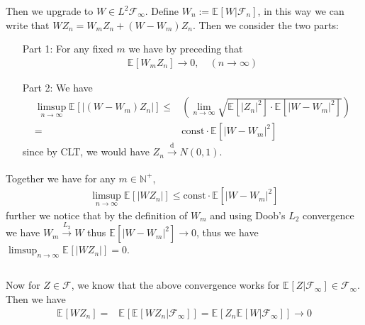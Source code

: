 \documentclass[11pt,a4paper]{ctexart}
\numberwithin{equation}{section}%
\newcommand{\F}{\mathcal{F}}
\begin{document}
Then we upgrade to $ W\in L^2\F_\infty $. Define $ W_n:= \mathbb{E}_{  }\left[ W| \F_{n} \right] $, in this way we can write that $ WZ_n = W_mZ_n + (W-W_m)Z_n $. Then we consider the two parts:
\begin{itemize}[topsep=2pt,itemsep=0pt]
    \item[Part 1:] For any fixed $ m $ we have by preceding that
    \begin{align*}
        \mathbb{E}_{  }\left[ W_mZ_n \right] \to 0,\quad (n\to\infty) 
    \end{align*}
    \item[Part 2:] We have
    \begin{align*}
        \limsup_{n\to\infty} \mathbb{E}_{  }\left[ \left\vert (W-W_m)Z_n \right\vert  \right]  \leq & (\lim_{n\to\infty}\sqrt{\mathbb{E}_{  }\left[ \left\vert Z_n \right\vert^2  \right] \cdot \mathbb{E}_{  }\left[ \left\vert W-W_m \right\vert^2  \right] }) \\
        =& \mathrm{const}\cdot \mathbb{E}_{  }\left[ \left\vert W-W_m \right\vert ^2 \right] 
    \end{align*}
    since by CLT, we would have $ Z_n\xrightarrow[]{\mathrm{d}} N(0,1) $.
\end{itemize}
Together we have for any $ m\in \mathbb{N}^+ $, 
\begin{align*}
    \limsup_{n\to\infty} \mathbb{E}_{  }\left[ \left\vert WZ_n \right\vert  \right] \leq \mathrm{const}\cdot \mathbb{E}_{  }\left[ \left\vert W-W_m \right\vert ^2 \right]
\end{align*}
further we notice that by the definition of $ W_m $ and using Doob's $ L_2 $ convergence we have $ W_m\xrightarrow[]{L_2} W $ thus $ \mathbb{E}_{  }\left[ \left\vert W-W_m \right\vert ^2  \right] \to 0 $, thus we have $ \limsup_{n\to\infty} \mathbb{E}_{  }\left[ \left\vert WZ_n \right\vert  \right] =0 $.






\subsection{}


Now for $ Z\in \F $, we know that the above convergence works for $ \mathbb{E}_{  }\left[ Z|\F_\infty \right]\in \F_{\infty}  $. Then we have
\begin{align*}
    \mathbb{E}_{  }\left[ WZ_n \right] = & \mathbb{E}_{  }\left[ \mathbb{E}_{  }\left[ WZ_n|\F_\infty \right]  \right] = \mathbb{E}_{  }\left[ Z_n \mathbb{E}_{  }\left[ W|\F_\infty \right]  \right]   \to 0
\end{align*}
\end{document}
